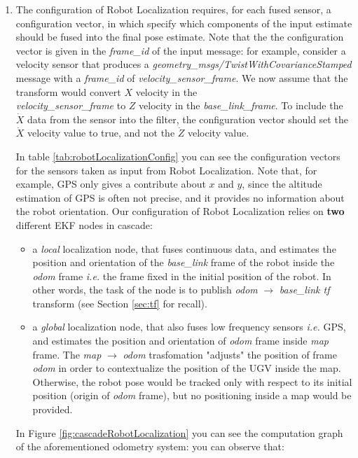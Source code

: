 \begin{enumerate}
	\item The configuration of Robot Localization requires, for each fused sensor, a configuration vector, in which specify which components of the input estimate should be fused into the final pose estimate. Note that the the configuration vector is given in the \textit{frame\_id} of the input message: for example, consider a velocity sensor that produces a \textit{geometry\_msgs/TwistWithCovarianceStamped} message with a \textit{frame\_id} of \textit{velocity\_sensor\_frame}. We now assume that the transform would convert $X$ velocity in the \\ \textit{velocity\_sensor\_frame} to $Z$ velocity in the \textit{base\_link\_frame}. To include the $\dot{X}$ data from the sensor into the filter, the configuration vector should set the $\dot{X}$ velocity value to true, and not the $\dot{Z}$ velocity value. 
\par In table \ref{tab:robotLocalizationConfig} you can see the configuration vectors for the sensors taken as input from Robot Localization. Note that, for example, GPS only gives a contribute about $x$ and $y$, since the altitude estimation of GPS is often not precise, and it provides no information about the robot orientation. Our configuration of Robot Localization relies on \textbf{two} different \ac{EKF} nodes in cascade:
	\begin{itemize}
		\item a \textit{local} localization node, that fuses continuous data, and estimates the position and orientation of the \textit{base\_link} frame of the robot inside the \textit{odom} frame \textit{i.e.} the frame fixed in the initial position of the robot. In other words, the task of the node is to publish \textit{odom} $\rightarrow$ \textit{base\_link tf} transform (see Section \ref{sec:tf} for recall). 
		\item a \textit{global} localization node, that also fuses low frequency sensors \textit{i.e.} GPS, and estimates the position and orientation of \textit{odom} frame inside \textit{map} frame. The \textit{map} $\rightarrow$ \textit{odom} trasfomation "adjusts" the position of frame \textit{odom} in order to contextualize the position of the \ac{UGV} inside the map. Otherwise, the robot pose would be tracked only with respect to its initial position (origin of \textit{odom} frame), but no positioning inside a map would be provided.
 	\end{itemize}
In Figure \ref{fig:cascadeRobotLocalization} you can see the computation graph of the aforementioned odometry system: you can observe that:

\end{enumerate}
